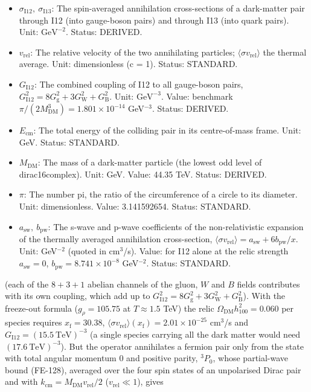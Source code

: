 \documentclass[
  10pt,
]{article}
\providecommand{\tightlist}{%
  \setlength{\itemsep}{0pt}\setlength{\parskip}{0pt}}
\begin{document}
\begin{itemize}
\tightlist
\item
  \(\sigma_{\mathrm{I12}},\ \sigma_{\mathrm{I13}}\): The spin-averaged
  annihilation cross-sections of a dark-matter pair through I12 (into
  gauge-boson pairs) and through I13 (into quark pairs). Unit:
  \(\mathrm{GeV}^{-2}\). Status: DERIVED.
\item
  \(v_{\mathrm{rel}}\): The relative velocity of the two annihilating
  particles; \(\langle\sigma v_{\mathrm{rel}}\rangle\) the thermal
  average. Unit: dimensionless (c = 1). Status: STANDARD.
\item
  \(G_{\mathrm{I12}}\): The combined coupling of I12 to all gauge-boson
  pairs,
  \(G_{\mathrm{I12}}^2 = 8G_{\mathrm{g}}^2 + 3G_{\mathrm{W}}^2 + G_{\mathrm{B}}^2\).
  Unit: \(\mathrm{GeV}^{-3}\). Value: benchmark
  \(\pi/(2M_{\mathrm{DM}}^3) = 1.801\times10^{-14}\) GeV\(^{-3}\).
  Status: DERIVED.
\item
  \(E_{\mathrm{cm}}\): The total energy of the colliding pair in its
  centre-of-mass frame. Unit: GeV. Status: STANDARD.
\item
  \(M_{\mathrm{DM}}\): The mass of a dark-matter particle (the lowest
  odd level of dirac16complex). Unit: GeV. Value: 44.35 TeV. Status:
  DERIVED.
\item
  \(\pi\): The number pi, the ratio of the circumference of a circle to
  its diameter. Unit: dimensionless. Value: 3.141592654. Status:
  STANDARD.
\item
  \(a_{\mathrm{sw}},\ b_{\mathrm{pw}}\): The s-wave and p-wave
  coefficients of the non-relativistic expansion of the thermally
  averaged annihilation cross-section,
  \(\langle\sigma v_{\mathrm{rel}}\rangle = a_{\mathrm{sw}} + 6b_{\mathrm{pw}}/x\).
  Unit: GeV\(^{-2}\) (quoted in cm\(^3\)/s). Value: for I12 alone at the
  relic strength \(a_{\mathrm{sw}} = 0\),
  \(b_{\mathrm{pw}} = 8.741\times10^{-8}\) GeV\(^{-2}\). Status:
  STANDARD.
\end{itemize}

(each of the \(8 + 3 + 1\) abelian channels of the gluon, \(W\) and
\(B\) fields contributes with its own coupling, which add up to
\(G_{\mathrm{I12}}^2 = 8G_{\mathrm{g}}^2 + 3G_{\mathrm{W}}^2 + G_{\mathrm{B}}^2\)).
With the freeze-out formula (\(g_\rho = 105.75\) at \(T \approx 1.5\)
TeV) the relic \(\Omega_{\mathrm{DM}}h_{100}^2 = 0.060\) per species
requires \(x_{\mathrm{f}} = 30.38\),
\(\langle\sigma v_{\mathrm{rel}}\rangle(x_{\mathrm{f}}) = 2.01\times10^{-25}\)
cm\(^3\)/s and \(G_{\mathrm{I12}} = (15.5\ \text{TeV})^{-3}\) (a single
species carrying all the dark matter would need
\((17.6\ \text{TeV})^{-3}\)). But the operator annihilates a fermion
pair only from the state with total angular momentum 0 and positive
parity, \(^3P_0\), whose partial-wave bound (FE-128), averaged over the
four spin states of an unpolarised Dirac pair and with
\(k_{\mathrm{cm}} = M_{\mathrm{DM}}v_{\mathrm{rel}}/2\)
(\(v_{\mathrm{rel}} \ll 1\)), gives
\end{document}
